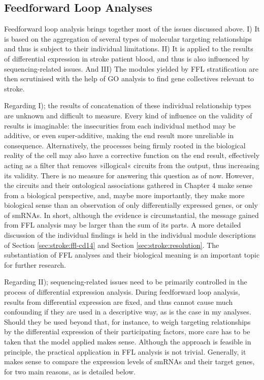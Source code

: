 \subsection{Feedforward Loop Analyses} \label{sec:discussion:ffl}
Feedforward loop analysis brings together most of the issues discussed above. I) It is based on the aggregation of several types of molecular targeting relationships and thus is subject to their individual limitations. II) It is applied to the results of differential expression in stroke patient blood, and thus is also influenced by sequencing-related issues. And III) The modules yielded by FFL stratification are then scrutinised with the help of GO analysis to find gene collectives relevant to stroke.

Regarding I); the results of concatenation of these individual relationship types are unknown and difficult to measure. Every kind of influence on the validity of results is imaginable: the insecurities from each individual method may be additive, or even super-additive, making the end result more unreliable in consequence. Alternatively, the processes being firmly rooted in the biological reality of the cell may also have a corrective function on the end result, effectively acting as a filter that removes »illogical« circuits from the output, thus increasing its validity. There is no measure for answering this question as of now. However, the circuits and their ontological associations gathered in Chapter 4 make sense from a biological perspective, and, maybe more importantly, they make more biological sense than an observation of only differentially expressed genes, or only of smRNAs. In short, although the evidence is circumstantial, the message gained from FFL analysis may be larger than the sum of its parts. A more detailed discussion of the individual findings is held in the individual module descriptions of Section \ref{sec:stroke:ffl-cd14} and Section \ref{sec:stroke:resolution}. The substantiation of FFL analyses and their biological meaning is an important topic for further research.

Regarding II); sequencing-related issues need to be primarily controlled in the process of differential expression analysis. During feedforward loop analysis, results from differential expression are fixed, and thus cannot cause much confounding if they are used in a descriptive way, as is the case in my analyses. Should they be used beyond that, for instance, to weigh targeting relationships by the differential expression of their participating factors, more care has to be taken that the model applied makes sense. Although the approach is feasible in principle, the practical application in FFL analysis is not trivial. Generally, it makes sense to compare the expression levels of smRNAs and their target genes, for two main reasons, as is detailed below.

